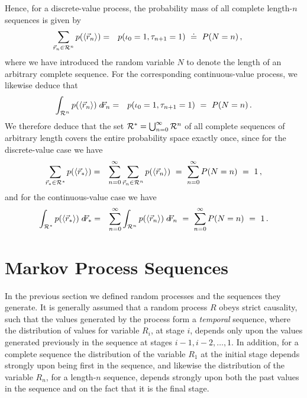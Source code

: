 \documentclass[a4paper]{article}
\begin{document}
Hence, for a discrete-value process, the probability mass of all complete length-$n$ sequences is given by
\begin{eqnarray}
\hspace*{-5mm}
\sum_{\vec{r}_n\in{\cal R}^n}
p(\langle\vec{r}_n\rangle)
& = & p(\iota_0=1,\tau_{n+1}=1)
~\doteq~P(N=n)\,,
\end{eqnarray}
where we have introduced the random variable $N$ to denote the length of an
arbitrary complete sequence. 
For the corresponding continuous-value process, we likewise deduce that
\begin{eqnarray}
\int_{{\cal R}^n}
p(\langle\vec{r}_n\rangle)\;d\!\vec{r}_n
& = & 
p(\iota_0=1,\tau_{n+1}=1)
~=~P(N=n)\,.
\end{eqnarray}
We therefore deduce that the set ${\cal R}^{*}=\bigcup_{n=0}^{\infty}{\cal R}^n$ 
of all complete sequences of arbitrary length
covers the entire probability space exactly once, since for the discrete-value case we have
\begin{eqnarray}
\sum_{\vec{r}_{*}\in{\cal R}^{*}}
p(\langle\vec{r}_{*}\rangle)
& = & \sum_{n=0}^{\infty}
\sum_{\vec{r}_n\in{\cal R}^n}
p(\langle\vec{r}_n\rangle)
~=~\sum_{n=0}^{\infty}P(N=n)~=~1\,,
\end{eqnarray}
and for the continuous-value case we have
\begin{eqnarray}
\int_{{\cal R}^{*}}
p(\langle\vec{r}_{*}\rangle)
\;d\!\vec{r}_{*}
& = & \sum_{n=0}^{\infty}
\int_{{\cal R}^n}
p(\langle\vec{r}_n\rangle)
\;d\!\vec{r}_n
~=~\sum_{n=0}^{\infty}P(N=n)~=~1\,.
\end{eqnarray}

\section{Markov Process Sequences}
\label{sec:markov-processes}
In the previous section we defined random processes and the sequences they generate.
It is generally assumed that a random process $R$ obeys strict causality, such that the
values generated by the process form a {\em temporal} sequence, where the distribution of
values for variable $R_i$, at stage $i$, depends only upon the values generated previously
in the sequence at stages $i-1,i-2,\ldots,1$. In addition, for a complete sequence
the distribution of the variable $R_1$ at the initial stage depends strongly upon being first
in the sequence, and likewise the distribution of the variable $R_n$, for a length-$n$
sequence, depends strongly upon both the past values in the sequence and on the fact
that it is the final stage.
\end{document}
